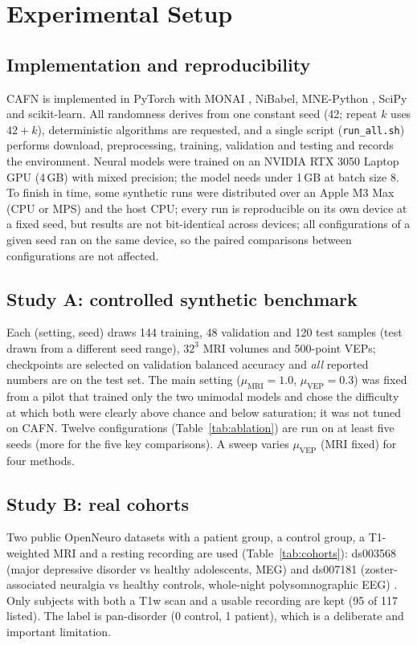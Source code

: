 \documentclass{ieeeaccessapprox}
\begin{document}
\section{Experimental Setup}\label{sec:setup}
\subsection{Implementation and reproducibility}
CAFN is implemented in PyTorch \cite{paszke2019} with MONAI \cite{cardoso2022}, NiBabel, MNE-Python \cite{gramfort2013}, SciPy \cite{virtanen2020} and scikit-learn. All randomness derives from one constant seed (42; repeat $k$ uses $42{+}k$), deterministic algorithms are requested, and a single script (\texttt{run\_all.sh}) performs download, preprocessing, training, validation and testing and records the environment. Neural models were trained on an NVIDIA RTX 3050 Laptop GPU (4\,GB) with mixed precision; the model needs under 1\,GB at batch size 8. To finish in time, some synthetic runs were distributed over an Apple M3 Max (CPU or MPS) and the host CPU; every run is reproducible on its own device at a fixed seed, but results are not bit-identical across devices; all configurations of a given seed ran on the same device, so the paired comparisons between configurations are not affected.

\subsection{Study A: controlled synthetic benchmark}
Each (setting, seed) draws 144 training, 48 validation and 120 test samples (test drawn from a different seed range), $32^3$ MRI volumes and 500-point VEPs; checkpoints are selected on validation balanced accuracy and \emph{all} reported numbers are on the test set. The main setting ($\mu_{\mathrm{MRI}}=1.0$, $\mu_{\mathrm{VEP}}=0.3$) was fixed from a pilot that trained only the two unimodal models and chose the difficulty at which both were clearly above chance and below saturation; it was not tuned on CAFN. Twelve configurations (Table~\ref{tab:ablation}) are run on at least five seeds (more for the five key comparisons). A sweep varies $\mu_{\mathrm{VEP}}$ (MRI fixed) for four methods.

\subsection{Study B: real cohorts}
Two public OpenNeuro datasets with a patient group, a control group, a T1-weighted MRI and a resting recording are used (Table~\ref{tab:cohorts}): ds003568 (major depressive disorder vs healthy adolescents, MEG) \cite{liuzzi2022ds003568} and ds007181 (zoster-associated neuralgia vs healthy controls, whole-night polysomnographic EEG) \cite{ds007181}. Only subjects with both a T1w scan and a usable recording are kept (95 of 117 listed). The label is pan-disorder (0 control, 1 patient), which is a deliberate and important limitation.
\end{document}
